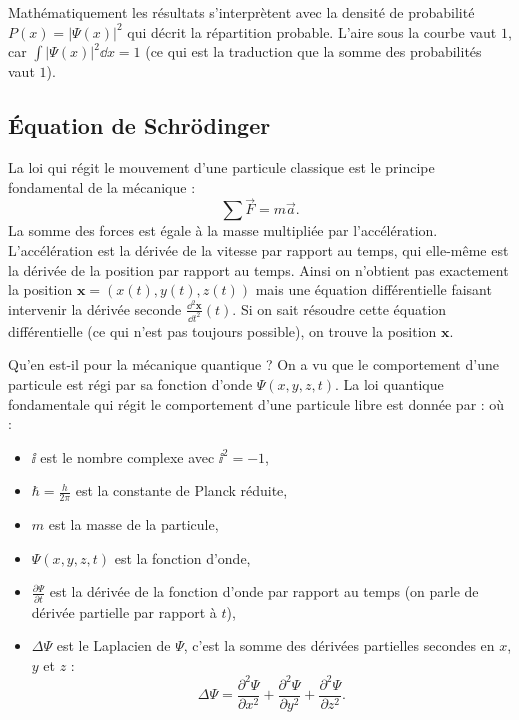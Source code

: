 \documentclass[11pt,class=report,crop=false]{standalone}
\begin{document}
Mathématiquement les résultats s'interprètent avec la densité de probabilité $P(x) = \left| \Psi(x) \right|^2$ qui décrit la répartition probable. L'aire sous la courbe vaut $1$, car $\int \left| \Psi(x) \right|^2 \dd x = 1$ (ce qui est la traduction que la somme des probabilités vaut $1$).



\subsection{Équation de Schrödinger}

La loi qui régit le mouvement d'une particule classique est le principe fondamental de la mécanique :
$$\sum \vec F = m \vec a.$$
La somme des forces est égale à la masse multipliée par l'accélération.
L'accélération est la dérivée de la vitesse par rapport au temps, qui elle-même est la dérivée de la position par rapport au temps.
Ainsi on n'obtient pas exactement la position $\mathbf{x} = (x(t),y(t),z(t))$  mais une équation différentielle faisant intervenir la dérivée seconde $\frac{\dd^2 \mathbf x}{\dd t^2}(t)$. Si on sait résoudre cette équation différentielle (ce qui n'est pas toujours possible), on trouve la position $\mathbf{x}$.

\bigskip

Qu'en est-il pour la mécanique quantique ?
On a vu que le comportement d'une particule est régi par sa fonction d'onde $\Psi(x,y,z,t)$.
La loi quantique fondamentale qui régit le comportement d'une particule libre est donnée par  :
où :
\begin{itemize}
  \item $\ii$ est le nombre complexe avec $\ii^2 = -1$,
  \item $\hbar = \frac{h}{2\pi}$ est la constante de Planck réduite,
  \item $m$ est la masse de la particule,
  \item $\Psi(x,y,z,t)$ est la fonction d'onde,
  \item $\frac{\partial \Psi}{\partial t}$ est la dérivée de la fonction d'onde par rapport au temps (on parle de dérivée partielle par rapport à $t$),
  \item $\Delta \Psi$ est le Laplacien de $\Psi$, c'est la somme des dérivées partielles secondes en $x$, $y$ et $z$ :
$$\Delta \Psi = \frac{\partial^2 \Psi}{\partial x^2} + \frac{\partial^2 \Psi}{\partial y^2} + \frac{\partial^2 \Psi}{\partial z^2}.$$
\end{itemize}
\end{document}
